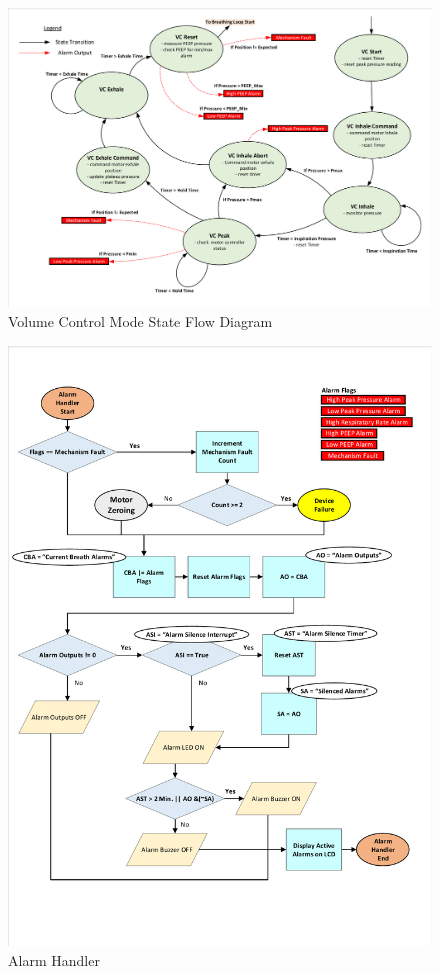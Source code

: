 \documentclass[]{article}
\begin{document}
\begin{appendices}
\begin{figure}
	\includegraphics[scale=0.8, trim = 6 6 6 6, clip]{figures/vc_mode.pdf}
	\caption{Volume Control Mode State Flow Diagram}
	\label{fig:vc_stfd}
\end{figure}

\begin{figure}
	\includegraphics[scale= 0.82, trim=15 70 15 50, clip]{figures/alarm_handler.pdf}
	\caption{Alarm Handler}
	\label{fig:alarm_loop}
\end{figure}



\end{appendices}
\end{document}
